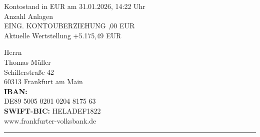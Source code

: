\documentclass[a4paper,9pt]{article}
\begin{document}
\vspace{0.8cm}

\noindent
\begin{minipage}[t]{0.5\textwidth}
{\small
Kontostand in EUR am 31.01.2026, 14:22 Uhr\\[0.2cm]
Anzahl Anlagen \\[0.3cm]
EING. KONTOUBERZIEHUNG ,00 EUR\\
Aktuelle Wertstellung \quad +5.175,49 EUR
}
\end{minipage}%
\hfill
\begin{minipage}[t]{0.4\textwidth}
\raggedleft
{\small
Herrn\\
Thomas M\"uller\\
Schillerstra\ss e 42\\
60313 Frankfurt am Main\\[0.3cm]
\textbf{IBAN:}\\
DE89 5005 0201 0204 8175 63\\[0.1cm]
\textbf{SWIFT-BIC:} HELADEF1822\\
www.frankfurter-volksbank.de
}
\end{minipage}

\vspace{0.5cm}
{\color{bankred}\rule{\textwidth}{3pt}}
\end{document}
